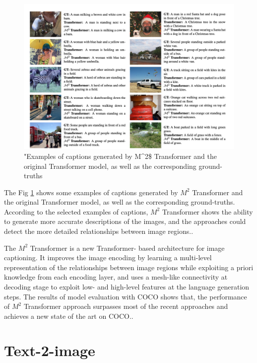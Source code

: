 \documentclass[
]{krantz}
\begin{document}
\begin{figure}

{\centering \includegraphics[width=1\linewidth]{figures/02-01/02-02 example2} 

}

\caption{"Examples of captions generated by M\^{}2\$ Transformer and the original Transformer model, as well as the corresponding ground-truths \citep{cornia2020m2}}\label{fig:example2}
\end{figure}

The Fig \ref{fig:example2} shows some examples of captions generated by \(M^2\) Transformer and the original Transformer model, as well as the corresponding ground-truths. According to the selected examples of captions, \(M^2\) Transformer shows the ability to generate more accurate descriptions of the images, and the approaches could detect the more detailed relationships between image regions.\citep{cornia2020m2}.

The \(M^2\) Transformer is a new Transformer- based architecture for image captioning. It improves the image encoding by learning a multi-level representation of the relationships between image regions while exploiting a priori knowledge from each encoding layer, and uses a mesh-like connectivity at decoding stage to exploit low- and high-level features at the language generation steps. The results of model evaluation with COCO shows that, the performance of \(M^2\) Transformer approach surpasses most of the recent approaches and achieves a new state of the art on COCO.\citep{cornia2020m2}.

\hypertarget{c02-02-text2img}{%
\section{Text-2-image}\label{c02-02-text2img}}
\end{document}
